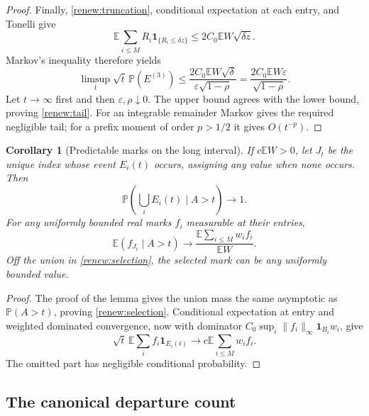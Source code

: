 \documentclass[11pt]{amsart}
\newtheorem{corollary}[theorem]{Corollary}
\theoremstyle{definition}
\theoremstyle{remark}
\newcommand{\E}{\mathbb E}
\newcommand{\PP}{\mathbb P}
\newcommand{\one}{\mathbf 1}
\begin{document}
\begin{proof}
Finally, \eqref{renew:truncation}, conditional expectation at each entry,
and Tonelli give
\[
 \E\sum_{i\le M}R_i\one_{\{R_i\le\delta z\}}
                 \le2C_0\E W\sqrt{\delta z}.
\]
Markov's inequality therefore yields
\begin{equation}\label{eq:assembly-small}
 \limsup_t\sqrt t\,\PP(E^{(3)})
 \le\frac{2C_0\E W\sqrt\delta}{\varepsilon\sqrt{1-\rho}}
 =\frac{2C_0\E W\varepsilon}{\sqrt{1-\rho}}.
\end{equation}
Let $t\to\infty$ first and then $\varepsilon,\rho\downarrow0$.
The upper bound agrees with the lower bound, proving \eqref{renew:tail}.
For an integrable remainder Markov gives the required negligible tail;
for a prefix moment of order $p>1/2$ it gives $O(t^{-p})$.
\end{proof}

\begin{corollary}[Predictable marks on the long interval]\label{renew:marks}
If $c\E W>0$, let $J_t$ be the unique index whose event $E_i(t)$ occurs,
assigning any value when none occurs. Then
\begin{equation}\label{renew:selection}
 \PP\left(\bigcup_iE_i(t)\mid A>t\right)\longrightarrow1.
\end{equation}
For any uniformly bounded real marks $f_i$ measurable at their entries,
\begin{equation}\label{renew:mark-law}
 \E(f_{J_t}\mid A>t)\longrightarrow
                 \frac{\E\sum_{i\le M}w_if_i}{\E W}.
\end{equation}
Off the union in \eqref{renew:selection}, the selected mark can be any
uniformly bounded value.
\end{corollary}
\begin{proof}
The proof of the lemma gives the union mass the same asymptotic as
$\PP(A>t)$, proving \eqref{renew:selection}. Conditional expectation at
entry and weighted dominated convergence, now with dominator
$C_0\sup_i\|f_i\|_\infty\one_{B_i}w_i$, give
\[
 \sqrt t\,\E\sum_i f_i\one_{E_i(t)}
                   \longrightarrow c\E\sum_{i\le M}w_if_i.
\]
The omitted part has negligible conditional probability.
\end{proof}

\subsection{The canonical departure count}
\end{document}
